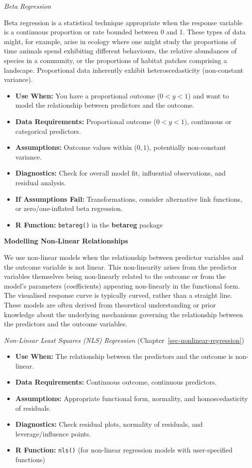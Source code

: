 \documentclass[
  letterpaper,
]{book}
\providecommand{\tightlist}{%
  \setlength{\itemsep}{0pt}\setlength{\parskip}{0pt}}\usepackage{longtable,booktabs,array}
\begin{document}
\emph{Beta Regression}

Beta regression is a statistical technique appropriate when the response
variable is a continuous proportion or rate bounded between 0 and 1.
These types of data might, for example, arise in ecology where one might
study the proportions of time animals spend exhibiting different
behaviours, the relative abundances of species in a community, or the
proportions of habitat patches comprising a landscape. Proportional data
inherently exhibit heteroscedasticity (non-constant variance).

\begin{itemize}
\tightlist
\item
  \textbf{Use When:} You have a proportional outcome (\(0 < y < 1\)) and
  want to model the relationship between predictors and the outcome.
\item
  \textbf{Data Requirements:} Proportional outcome (\(0 < y < 1\)),
  continuous or categorical predictors.
\item
  \textbf{Assumptions:} Outcome values within (\(0,1\)), potentially
  non-constant variance.
\item
  \textbf{Diagnostics:} Check for overall model fit, influential
  observations, and residual analysis.
\item
  \textbf{If Assumptions Fail:} Transformations, consider alternative
  link functions, or zero/one-inflated beta regression.
\item
  \textbf{R Function:} \texttt{betareg()} in the \textbf{betareg}
  package
\end{itemize}

\textbf{Modelling Non-Linear Relationships}

We use non-linear models when the relationship between predictor
variables and the outcome variable is not linear. This non-linearity
arises from the predictor variables themselves being non-linearly
related to the outcome or from the model's parameters (coefficients)
appearing non-linearly in the functional form. The visualised response
curve is typically curved, rather than a straight line. These models are
often derived from theoretical understanding or prior knowledge about
the underlying mechanisms governing the relationship between the
predictors and the outcome variables.

\emph{Non-Linear Least Squares (NLS) Regression}
(Chapter~\ref{sec-nonlinear-regression})

\begin{itemize}
\tightlist
\item
  \textbf{Use When:} The relationship between the predictors and the
  outcome is non-linear.
\item
  \textbf{Data Requirements:} Continuous outcome, continuous predictors.
\item
  \textbf{Assumptions:} Appropriate functional form, normality, and
  homoscedasticity of residuals.
\item
  \textbf{Diagnostics:} Check residual plots, normality of residuals,
  and leverage/influence points.
\item
  \textbf{R Function:} \texttt{nls()} (for non-linear regression models
  with user-specified functions)
\end{itemize}
\end{document}
